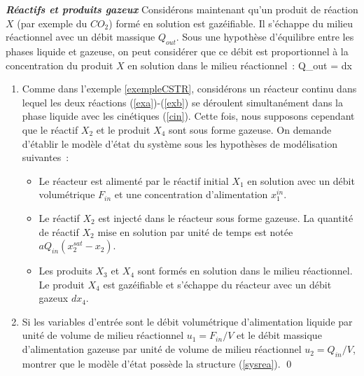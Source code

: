 \begin{exercice}{\bf \em Réactifs et produits gazeux}
Considérons maintenant qu'un produit de réaction $X$ (par exemple du $CO_2$)
formé en solution est gazéifiable. Il s'échappe du milieu réactionnel avec un débit
massique $Q_{out}$. Sous une hypothèse d'équilibre entre les phases liquide et
gazeuse, on peut considérer que ce débit est proportionnel à la concentration du
produit $X$	en solution dans le milieu réactionnel~:
\eqnn
Q_{out} = dx
\eeqnn
\begin{enumerate}
\item Comme dans l'exemple \ref{exempleCSTR}, considérons un réacteur
continu  dans lequel
 les deux réactions (\ref{exa})-(\ref{exb})
se déroulent simultanément dans la phase liquide avec les cinétiques
(\ref{cin}).  Cette fois, nous supposons cependant que le
réactif $X_2$ et le produit $X_4$ sont sous forme gazeuse. 
On demande d'établir le modèle d'état du système sous les hypothèses de modélisation suivantes~: 
\begin{itemize} 
\item Le réacteur est alimenté par le réactif initial $X_1$ en
solution avec un débit volumétrique $F_{in}$ et une
concentration d'alimentation $x_1^{in}$. 
\item Le réactif $X_2$ est injecté dans le réacteur sous forme gazeuse.
  La quantité de réactif $X_2$ mise en
solution par unité de temps est notée $aQ_{in}(x_2^{sat} - x_2)$.
\item Les produits $X_3$ et $X_4$ sont
formés en solution dans le milieu réactionnel. Le produit $X_4$ est
gazéifiable et s'échappe du réacteur avec un débit gazeux $dx_4$.
\end{itemize}
\item Si les variables d'entrée sont le débit volumétrique d'alimentation liquide par unité de
volume de milieu réactionnel $u_1 = F_{in}/V$ et le débit massique d'alimentation
gazeuse par unité de volume de milieu réactionnel $u_2 = Q_{in}/V$, montrer
que le modèle d'état possède la structure (\ref{sysrea}). \qed
\end{enumerate}
\end{exercice}
\vv

